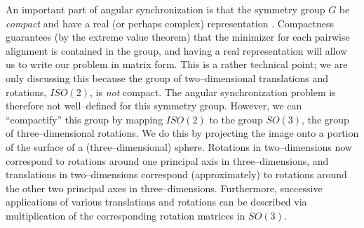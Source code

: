 \documentclass[11pt]{article}
\begin{document}
An important part of angular synchronization is that the symmetry group $G$ be {\em compact} and have a real (or perhaps complex) representation \cite{singer2011angular}.
%
Compactness guarantees (by the extreme value theorem) that the minimizer for each pairwise alignment is contained in the group,
and having a real representation will allow us to write our problem in matrix form. 
%
This is a rather technical point;
we are only discussing this because the group of two--dimensional translations and rotations, $ISO(2)$, is {\em not} compact.
%
The angular synchronization problem is therefore not well--defined for this symmetry group.
%
However, we can ``compactify'' this group by mapping $ISO(2)$ to the group $SO(3)$, the group of three--dimensional rotations.
%
We do this by projecting the image onto a portion of the surface of a (three--dimensional) sphere.
%
Rotations in two--dimensions now correspond to rotations around one principal axis in three--dimensions, and translations in two--dimensions correspond (approximately) to rotations around the other two principal axes in three--dimensions.
%
Furthermore, successive applications of various translations and rotations can be described via multiplication of the corresponding rotation matrices in $SO(3)$.
\end{document}
